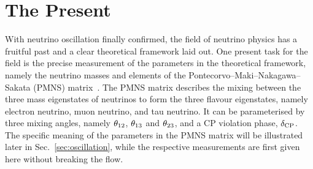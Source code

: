 





\section{The Present}
With neutrino oscillation finally confirmed, the field of neutrino physics has a fruitful past and a clear theoretical framework laid out.
One present task for the field is the precise measurement of the parameters in the theoretical framework, namely the neutrino masses and elements of the Pontecorvo–Maki–Nakagawa–Sakata (PMNS) matrix~\cite{Pontecorvo:1957qd, Maki:1962mu}.
The PMNS matrix describes the mixing between the three mass eigenstates of neutrinos to form the three flavour eigenstates, namely electron neutrino, muon neutrino, and tau neutrino.
It can be parameterised by three mixing angles, namely $\theta_{12}$, $\theta_{13}$ and $\theta_{23}$, and a CP violation phase, $\delta_\textrm{CP}$.
The specific meaning of the parameters in the PMNS matrix will be illustrated later in Sec.~\ref{sec:oscillation}, while the respective measurements are first given here without breaking the flow.

